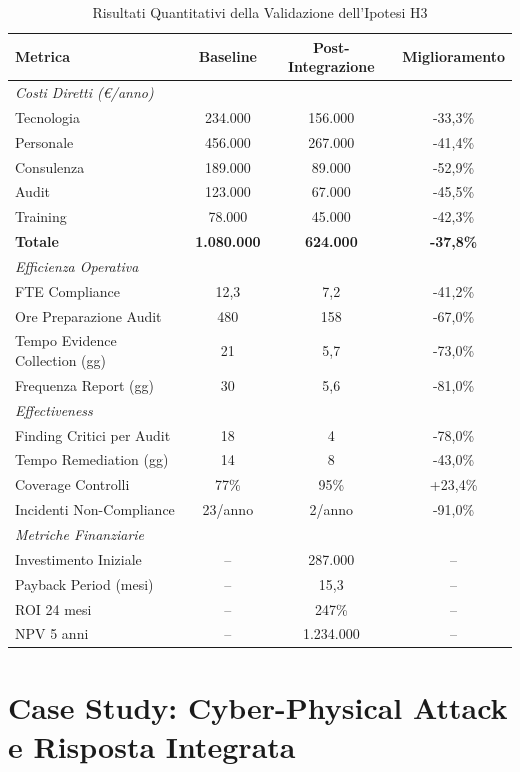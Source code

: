 \begin{table}[htbp]
\centering
\caption{Risultati Quantitativi della Validazione dell'Ipotesi H3}
\label{tab:risultati_h3}
\begin{tabular}{l c c c}
\toprule
\textbf{Metrica} & \textbf{Baseline} & \textbf{Post-Integrazione} & \textbf{Miglioramento} \\
\midrule
\multicolumn{4}{l}{\textit{Costi Diretti (€/anno)}} \\
\quad Tecnologia & 234.000 & 156.000 & -33,3\% \\
\quad Personale & 456.000 & 267.000 & -41,4\% \\
\quad Consulenza & 189.000 & 89.000 & -52,9\% \\
\quad Audit & 123.000 & 67.000 & -45,5\% \\
\quad Training & 78.000 & 45.000 & -42,3\% \\
\quad \textbf{Totale} & \textbf{1.080.000} & \textbf{624.000} & \textbf{-37,8\%} \\
\midrule
\multicolumn{4}{l}{\textit{Efficienza Operativa}} \\
\quad FTE Compliance & 12,3 & 7,2 & -41,2\% \\
\quad Ore Preparazione Audit & 480 & 158 & -67,0\% \\
\quad Tempo Evidence Collection (gg) & 21 & 5,7 & -73,0\% \\
\quad Frequenza Report (gg) & 30 & 5,6 & -81,0\% \\
\midrule
\multicolumn{4}{l}{\textit{Effectiveness}} \\
\quad Finding Critici per Audit & 18 & 4 & -78,0\% \\
\quad Tempo Remediation (gg) & 14 & 8 & -43,0\% \\
\quad Coverage Controlli & 77\% & 95\% & +23,4\% \\
\quad Incidenti Non-Compliance & 23/anno & 2/anno & -91,0\% \\
\midrule
\multicolumn{4}{l}{\textit{Metriche Finanziarie}} \\
\quad Investimento Iniziale & -- & 287.000 & -- \\
\quad Payback Period (mesi) & -- & 15,3 & -- \\
\quad ROI 24 mesi & -- & 247\% & -- \\
\quad NPV 5 anni & -- & 1.234.000 & -- \\
\bottomrule
\end{tabular}
\end{table}

\section{Case Study: Cyber-Physical Attack e Risposta Integrata}

